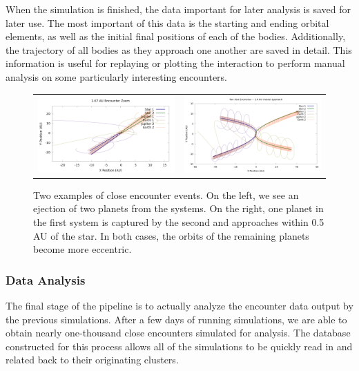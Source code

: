 \documentclass[12pt]{article}
\begin{document}
    When the simulation is finished, the data important for later analysis is
    saved for later use. The most important of this data is the starting and ending
    orbital elements, as well as the initial final positions of each of the bodies.
    Additionally, the trajectory of all bodies as they approach one another are
    saved in detail. This information is useful for replaying or plotting the
    interaction to perform manual analysis on some particularly interesting 
    encounters.

    \begin{figure}[H]
        \centering
        \caption{Two examples of close encounter events. On the left, we see
            an ejection of two planets from the systems. On the right, one planet
            in the first system is captured by the second and approaches 
            within 0.5 AU of the star. In both cases, the
            orbits of the remaining planets become more eccentric.
        }
        \begin{tabular}{cc}
            \includegraphics[width=3in]{1_67_AU_zoom} &
            \includegraphics[width=3in]{1.4AU/1_4_AU_encounter_plot}
        \end{tabular}
    \end{figure}

    \subsubsection{Data Analysis}

    The final stage of the pipeline is to actually analyze the encounter data 
    output by the previous simulations. After a few days of running simulations,
    we are able to obtain nearly one-thousand close encounters simulated
    for analysis. The database constructed for this process allows all of the
    simulations to be quickly read in and related back to their originating clusters.
\end{document}

